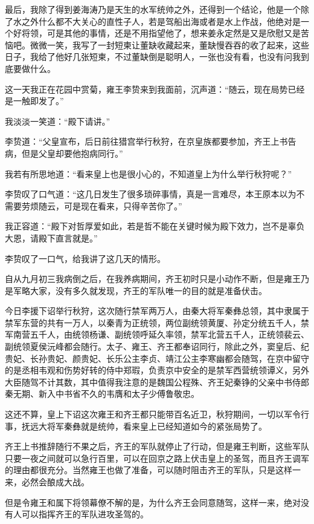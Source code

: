 最后，我除了得到姜海涛乃是天生的水军统帅之外，还得到一个结论，他是一个除了水之外什么都不大关心的直性子人，若是驾船出海或者是水上作战，他绝对是一个好将领，可是其他的事情，还是不用指望他了，想来姜永定然是又是欣慰又是苦恼吧。微微一笑，我写了一封短柬让董缺收藏起来，董缺慢吞吞的收了起来，这些日子，我给了他好几张短柬，不过董缺倒是聪明人，一张也没有看，也没有问我到底要做什么。

这一天我正在花园中赏菊，雍王李贽来到我面前，沉声道：“随云，现在局势已经是一触即发了。”

我淡淡一笑道：“殿下请讲。”

李贽道：“父皇宣布，后日前往猎宫举行秋狩，在京皇族都要参加，齐王上书告病，但是父皇却要他抱病同行。”

我若有所思地道：“看来皇上也是很小心的，不知道皇上为什么举行秋狩呢？”

李贽叹了口气道：“这几日发生了很多琐碎事情，真是一言难尽，本王原本以为不需要劳烦随云，可是现在看来，只得辛苦你了。”

我正容道：“殿下对哲厚爱如此，若是哲不能在关键时候为殿下效力，岂不是辜负大恩，请殿下直言就是。”

李贽叹了一口气，给我讲了这几天的情形。

自从九月初三我病倒之后，在我养病期间，齐王初时只是小动作不断，但是雍王乃是军略大家，没有多久就发现，齐王的军队唯一的目的就是准备伏击。

今日李援下诏举行秋狩，这次随行禁军两万人，由秦大将军秦彝总领，其中隶属于禁军东营的共有一万人，以秦青为正统领，两位副统领黄厦、孙定分统五千人，禁军南营五千人，由统领杨谦、副统领呼延久率领，禁军北营五千人，正统领裴云、副统领夏侯沅峰都会随行。太子、雍王、齐王都奉诏同行，除此之外，窦皇后、纪贵妃、长孙贵妃、颜贵妃、长乐公主李贞、靖江公主李寒幽都会随驾，在京中留守的是丞相韦观和伤势好转的侍中郑瑕，负责京中安全的是禁军西营统领谭义，另外大臣随驾不计其数，其中值得我注意的是魏国公程殊、齐王妃秦铮的父亲中书侍郎秦无期、新入中书省不久的韦膺和太子少傅鲁敬忠。

这还不算，皇上下诏这次雍王和齐王都只能带百名近卫，秋狩期间，一切以军令行事，抚远大将军秦彝就是统帅，看来皇上已经知道如今的紧张局势了。

齐王上书推辞随行不果之后，齐王的军队就停止了行动，但是雍王判断，这些军队只要一夜之间就可以急行百里，可以在回京之路上伏击皇上的圣驾，而且齐王调军的理由都很充分。当然雍王也做了准备，可以随时阻击齐王的军队，只是这样一来，必然会酿成大战。

但是令雍王和属下将领幕僚不解的是，为什么齐王会同意随驾，这样一来，绝对没有人可以指挥齐王的军队进攻圣驾的。

